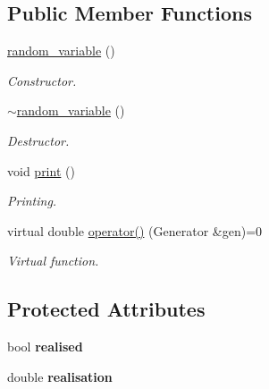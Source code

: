\subsection*{Public Member Functions}
\begin{DoxyCompactItemize}
\item 
\mbox{\label{classrandom__variable_a6dbf2b284fff6629a1bf61ed5f63b1db}} 
\mbox{\hyperlink{classrandom__variable_a6dbf2b284fff6629a1bf61ed5f63b1db}{random\+\_\+variable}} ()
\begin{DoxyCompactList}\small\item\em Constructor. \end{DoxyCompactList}\item 
\mbox{\label{classrandom__variable_ae9066f6c557c9b64233f087bd2dfb6b1}} 
\mbox{\hyperlink{classrandom__variable_ae9066f6c557c9b64233f087bd2dfb6b1}{$\sim$random\+\_\+variable}} ()
\begin{DoxyCompactList}\small\item\em Destructor. \end{DoxyCompactList}\item 
\mbox{\label{classrandom__variable_aa3b0e1dfeb750216df2043e96f72c017}} 
void \mbox{\hyperlink{classrandom__variable_aa3b0e1dfeb750216df2043e96f72c017}{print}} ()
\begin{DoxyCompactList}\small\item\em Printing. \end{DoxyCompactList}\item 
\mbox{\label{classrandom__variable_a661cc29297837ef5aba0b7e476f114b2}} 
virtual double \mbox{\hyperlink{classrandom__variable_a661cc29297837ef5aba0b7e476f114b2}{operator()}} (Generator \&gen)=0
\begin{DoxyCompactList}\small\item\em Virtual function. \end{DoxyCompactList}\end{DoxyCompactItemize}
\subsection*{Protected Attributes}
\begin{DoxyCompactItemize}
\item 
\mbox{\label{classrandom__variable_a94420df0549a9276fa277e55cd9f8a5c}} 
bool {\bfseries realised}
\item 
\mbox{\label{classrandom__variable_a5b1d23131a974247dad648dd36c90732}} 
double {\bfseries realisation}
\end{DoxyCompactItemize}


